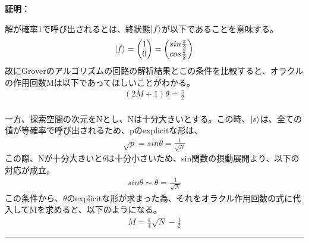\documentclass[a4paper,10.5pt]{article}
\numberwithin{equation}{section}
\newenvironment{proofbox}
{\begin{prooflabel}\textbf{証明：}\end{prooflabel}\vspace{0.8em}}
{\par\vspace{1em}\hrule\vspace{1em}}
\begin{document}
\begin{proofbox}
    
    解が確率1で呼び出されるとは、終状態$\ket{f}$が以下であることを意味する。
    \begin{align*}
        \ket{f}=\begin{pmatrix}
   1 \\ 0
    \end{pmatrix}
    =\begin{pmatrix}
   sin\frac{\pi}{2} \\ cos\frac{\pi}{2}
    \end{pmatrix}
    \end{align*}
    故にGroverのアルゴリズムの回路の解析結果とこの条件を比較すると、オラクルの作用回数Mは以下であってほしいことがわかる。
    \begin{align*}
        (2M+1)\theta=\frac{\pi}{2}
    \end{align*}
    \\
    一方、探索空間の次元をNとし、Nは十分大きいとする。この時、$\ket{s}$は、全ての値が等確率で呼び出されるため、pのexplicitな形は、
    \begin{align*}
        \sqrt{p}=sin\theta=\frac{1}{\sqrt{N}}
    \end{align*}
    この際、Nが十分大きいと$\theta$は十分小さいため、sin関数の摂動展開より、以下の対応が成立。
    \begin{align*}
        sin\theta\sim\theta=\frac{1}{\sqrt{N}}
    \end{align*}
    この条件から、$\theta$のexplicitな形が求まった為、それをオラクル作用回数の式に代入してMを求めると、以下のようになる。
    \begin{align*}
        M=\frac{\pi}{4}\sqrt{N}-\frac{1}{2}
    \end{align*}
\end{proofbox}
\end{document}
